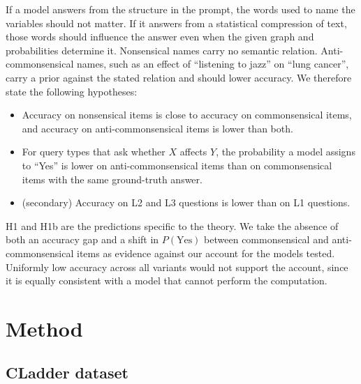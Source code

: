 \documentclass{llncs}
\begin{document}
If a model answers from the structure in the prompt, the words used to name the variables should not matter. If it answers from a statistical compression of text, those words should influence the answer even when the given graph and probabilities determine it. Nonsensical names carry no semantic relation. Anti-commonsensical names, such as an effect of ``listening to jazz'' on ``lung cancer'', carry a prior against the stated relation and should lower accuracy. We therefore state the following hypotheses:

\begin{itemize}
\item[\textbf{H1}] Accuracy on nonsensical items is close to accuracy on commonsensical items, and accuracy on anti-commonsensical items is lower than both.
\item[\textbf{H1b}] For query types that ask whether $X$ affects $Y$, the probability a model assigns to ``Yes'' is lower on anti-commonsensical items than on commonsensical items with the same ground-truth answer.
\item[\textbf{H2}] (secondary) Accuracy on L2 and L3 questions is lower than on L1 questions.
\end{itemize}

H1 and H1b are the predictions specific to the theory. We take the absence of both an accuracy gap and a shift in $P(\text{Yes})$ between commonsensical and anti-commonsensical items as evidence against our account for the models tested. Uniformly low accuracy across all variants would not support the account, since it is equally consistent with a model that cannot perform the computation.

\section{Method}
\label{sec:method}

\subsection{CLadder dataset}
\label{sec:cladder}
\end{document}
